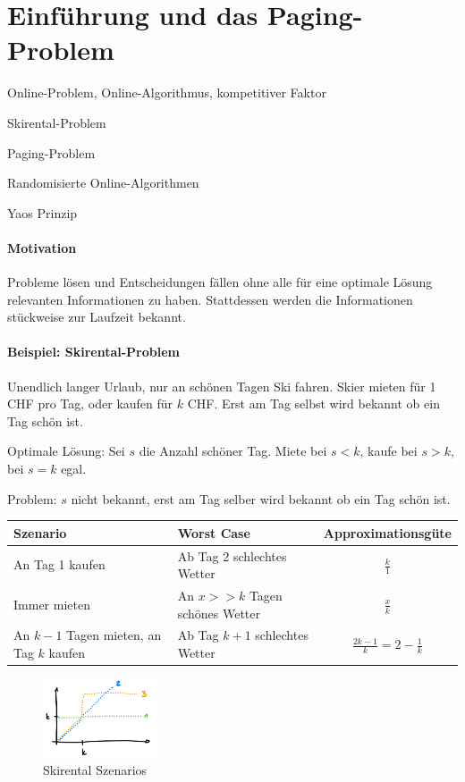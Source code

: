 \section{Einführung und das Paging-Problem}

\begin{takeaway}
    \item Online-Problem, Online-Algorithmus, kompetitiver Faktor
    \item Skirental-Problem
    \item Paging-Problem
    \item Randomisierte Online-Algorithmen
    \item Yaos Prinzip
\end{takeaway}

\paragraph{Motivation}
Probleme lösen und Entscheidungen fällen ohne alle für eine optimale Lösung relevanten Informationen zu haben.
Stattdessen werden die Informationen stückweise zur Laufzeit bekannt.

\paragraph{Beispiel: Skirental-Problem}
Unendlich langer Urlaub, nur an schönen Tagen Ski fahren.
Skier mieten für 1 CHF pro Tag, oder kaufen für $k$ CHF.
Erst am Tag selbst wird bekannt ob ein Tag schön ist.

Optimale Lösung: Sei $s$ die Anzahl schöner Tag.
Miete bei $s < k$, kaufe bei $s > k$, bei $s=k$ egal.

Problem: $s$ nicht bekannt, erst am Tag selber wird bekannt ob ein Tag schön ist.

\begin{table}[h]
    \begin{tabular}{l|l|c}
        Szenario & Worst Case & Approximationsgüte \\ \hline
        An Tag 1 kaufen & Ab Tag 2 schlechtes Wetter & $\frac{k}{1}$ \\
        Immer mieten & An $x >> k$ Tagen schönes Wetter & $\frac{x}{k}$ \\
        An $k-1$ Tagen mieten, an Tag $k$ kaufen & Ab Tag $k+1$ schlechtes Wetter & $\frac{2k-1}{k} = 2-\frac{1}{k}$
    \end{tabular}
\end{table}
\begin{figure}[h]
    \centering
    \includegraphics[width=0.3\textwidth]{images/skirental.png}
    \caption{Skirental Szenarios}
\end{figure}

